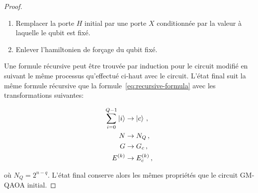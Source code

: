 \begin{proof}
\begin{enumerate}
    \item Remplacer la porte $H$ initial par une porte $X$ conditionnée par la valeur à laquelle le qubit est fixé.
    \item Enlever l'hamiltonien de forçage du qubit fixé.
\end{enumerate}

Une formule récursive peut être trouvée par induction pour le circuit modifié en suivant le même processus qu'effectué ci-haut avec le circuit. L'état final suit la même formule récursive que la formule~\ref{eq:recursive-formula} avec les transformations suivantes:

\begin{equation}    
\begin{aligned}
    \sum_{i=0}^{Q-1} \ket{i} &\to \ket{c} \,, \\
    N &\to N_{Q} \,, \\
    G &\to G_{c} \,, \\
    E^{(k)} &\to E^{(k)}_{c} \,,
\end{aligned}
\end{equation}

où $N_{Q} = 2^{n-q}$. L'état final conserve alors les mêmes propriétés que le circuit GM-QAOA initial.
\end{proof}

